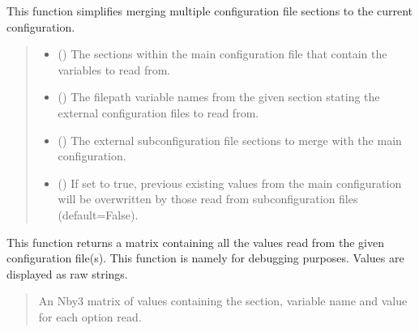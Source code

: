 \documentclass[letterpaper,10pt,english]{sphinxmanual}
\begin{document}
\begin{fulllineitems}
\begin{fulllineitems}
\pysigstopsignatures
\sphinxAtStartPar
This function simplifies merging multiple configuration file sections
to the current configuration.
\begin{quote}\begin{description}
\begin{itemize}
\item {} 
\sphinxAtStartPar
{} () \textendash{} The sections within the main configuration file
that contain the variables to read from.

\item {} 
\sphinxAtStartPar
{} () \textendash{} The filepath variable names from the given
section stating the external configuration files to read from.

\item {} 
\sphinxAtStartPar
{} () \textendash{} The external sub\sphinxhyphen{}configuration file sections
to merge with the main configuration.

\item {} 
\sphinxAtStartPar
{} () \textendash{} If set to true, previous existing values from
the main configuration will be overwritten by those read from
sub\sphinxhyphen{}configuration files (default=False).

\end{itemize}

\end{description}\end{quote}

\end{fulllineitems}


\begin{fulllineitems}
\label{\detokenize{modules/input/config_handler:qnav.input.config_handler.ConfigHandler.get_all_values}}
\pysigstartsignatures
{}
\pysigstopsignatures
\sphinxAtStartPar
This function returns a matrix containing all the values read from the
given configuration file(s). This function is namely for debugging
purposes. Values are displayed as raw strings.
\begin{quote}\begin{description}
\sphinxAtStartPar
An N\sphinxhyphen{}by\sphinxhyphen{}3 matrix of values containing the section, variable
name and value for each option read.


\end{description}
\end{quote}
\end{fulllineitems}
\end{fulllineitems}
\end{document}
